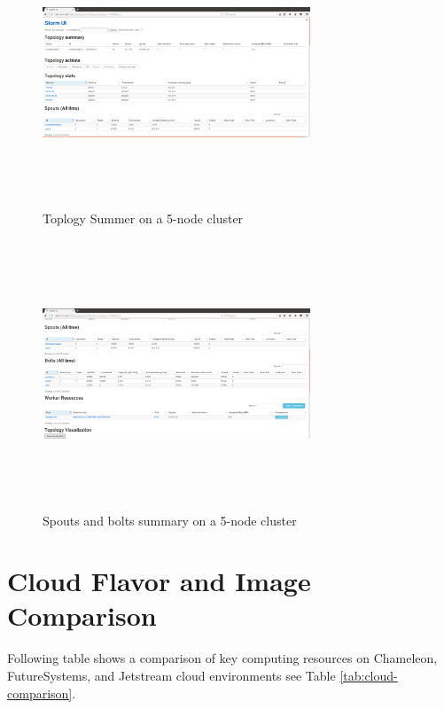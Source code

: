 \documentclass[9pt,twocolumn,twoside]{../../styles/osajnl}
\begin{document}
\begin{figure}[!htb]
  \includegraphics[width=8cm,height=8cm,keepaspectratio,width=\linewidth]{images/bench-4.png}
  \caption{Toplogy Summer on a 5-node cluster }
  \label{Topology summary on a 5-node cluster}
\end{figure}

\begin{figure}[!htb]
  \centering
  \includegraphics[width=8cm,height=8cm,keepaspectratio,width=\linewidth]{images/bench-5.png}
  \caption{Spouts and bolts summary on a 5-node cluster }
  \label{Spouts and bolts summary on a 5-node cluster}
\end{figure}

\clearpage

\section{Cloud Flavor and Image Comparison}


Following table shows a comparison of key computing resources on Chameleon, FutureSystems, and Jetstream cloud environments see Table \ref{tab:cloud-comparison}.
\end{document}
